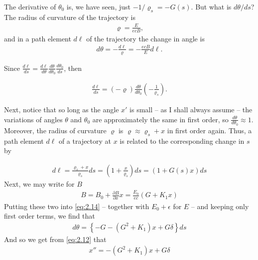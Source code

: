 The derivative of $\theta_0$ is, we have seen, just $-1/\varrho_s = -G(s)$. But what is $d\theta/ds$? The radius of curvature of the trajectory is
\begin{align} \label{eq:2.13}
	\varrho = \frac{E}{ecB},
\end{align}
and in a path element $d\ell$ of the trajectory the change in angle is
\begin{align}
	d\theta = -\frac{d\ell}{\varrho} = -\frac{ecB}{E}d\ell\label{eq:2.14}.
\end{align}

Since $\frac{d\ell}{ds} = \frac{d\ell}{d\theta}\frac{d\theta}{d\theta_0}\frac{d\theta_0}{ds}$, then

\begin{align*}
\frac{d\ell}{ds} = \left(-\varrho\right)\frac{d\theta}{d\theta_0}\left(-\frac{1}{\varrho_s}\right).
\end{align*}

Next, notice that so long as the angle $x'$ is small -- as I shall always assume -- the variations of angles $\theta$ and $\theta_0$ are approximately the same in first order,
so $\frac{d\theta}{d\theta_0} \approx 1$. Moreover, the radius of curvature $\varrho$ is $\varrho \approx \varrho_s + x$ in first order again. Thus, a path element $d\ell$ of a trajectory at
$x$ is related to the corresponding change in $s$ by

\begin{align}
	d\ell = \frac{\varrho_s + x}{\varrho_s} ds = \left(1+\frac{x}{\varrho_s}\right)ds = (1+G(s)x)ds\label{eq:2.15}
\end{align}
Next, we may write for $B$
\begin{align}
	B = B_0 + \frac{\partial B}{\partial x}x = \frac{E_0}{ec}(G+K_1x)\label{eq:2.16}
\end{align}
Putting these two into \eqref{eq:2.14} -- together with $E_0 + \epsilon$ for $E$ -- and keeping only first order terms, we find that
\begin{align*}
	d\theta = \left\{-G-(G^2+K_1)x + G\delta\right\}ds
\end{align*}
And so we get from \eqref{eq:2.12} that
\begin{align}\label{eq:2.17}
	x'' = -(G^ 2+K_1)x + G\delta
\end{align}


